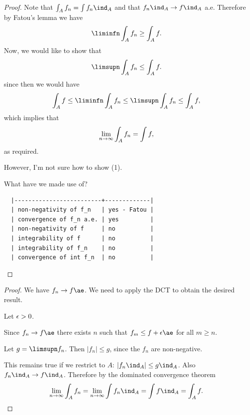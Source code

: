 \begin{proof}
  Note that $\int_A f_n = \int f_n\ind_A$ and that $f_n\ind_A \to f\ind_A$ a.e. Therefore by Fatou's lemma we have
  \begin{align*}
    \liminfn \int_A f_n \geq \int_A f.
  \end{align*}
  Now, we would like to show that
  \begin{align}
    \limsupn \int_A f_n \leq \int_A f.
  \end{align}
  since then we would have
  \begin{align*}
    \int_A f \leq \liminfn \int_A f_n \leq \limsupn \int_A f_n \leq \int_A f,
  \end{align*}
  which implies that
  \begin{align*}
    \limn \int_A f_n = \int f,
  \end{align*}
  as required.

  However, I'm not sure how to show (1).

  What have we made use of?
\begin{verbatim}
  |-------------------------+-------------|
  | non-negativity of f_n   | yes - Fatou |
  | convergence of f_n a.e. | yes         |
  | non-negativity of f     | no          |
  | integrability of f      | no          |
  | integrability of f_n    | no          |
  | convergence of int f_n  | no          |
\end{verbatim}
\end{proof}

\begin{proof}
  We have $f_n \to f \ae$. We need to apply the DCT to obtain the desired result.

  Let $\epsilon > 0$.

  Since $f_n \to f \ae$ there exists $n$ such that $f_m \leq f + \eps \ae$ for all $m \geq n$.


  Let $g = \limsupn f_n$. Then $|f_n| \leq g$, since the $f_n$ are non-negative.

  This remains true if we restrict to $A$: $|f_n\ind_A| \leq g \ind_A$. Also $f_n\ind_A \to f\ind_A$. Therefore
  by the dominated convergence theorem
  \begin{align*}
    \limn \int_A f_n = \limn \int f_n\ind_A = \int f\ind_A = \int_A f.
  \end{align*}
\end{proof}


